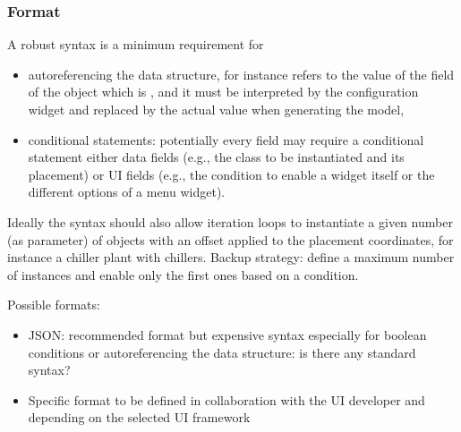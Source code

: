 \documentclass[letterpaper,10pt, openany,english]{sphinxmanual}
\begin{document}
\subsubsection{Format}
\label{\detokenize{requirements:format}}
A robust syntax is a minimum requirement for
\begin{itemize}
\item {} 
auto\sphinxhyphen{}referencing the data structure, for instance  refers to the value of the field  of the object which  is , and it must be interpreted by the configuration widget and replaced by the actual value when generating the model,

\item {} 
conditional statements: potentially every field may require a conditional statement \textendash{} either data fields (e.g., the class to be instantiated and its placement) or UI fields (e.g., the condition to enable a widget itself or the different options of a menu widget).

\end{itemize}

Ideally the syntax should also allow iteration  loops to instantiate a given number (as parameter) of objects with an offset applied to the placement coordinates, for instance a chiller plant with  chillers. Backup strategy: define a maximum number of instances and enable only the first  ones based on a condition.

Possible formats:
\begin{itemize}
\item {} 
JSON: recommended format but expensive syntax especially for boolean conditions or auto\sphinxhyphen{}referencing the data structure: is there any standard syntax?

\item {} 
Specific format to be defined in collaboration with the UI developer and depending on the selected UI framework

\end{itemize}
\end{document}
